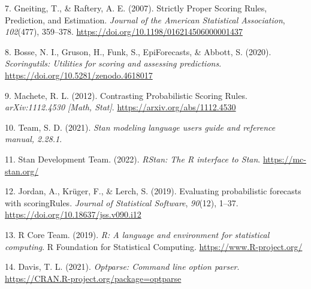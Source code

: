 \documentclass[
]{article}
\newlength{\cslhangindent}
\newlength{\cslentryspacingunit} %
\newenvironment{CSLReferences}[2] %
 {%
  \setlength{\parindent}{0pt}
  \ifodd #1
  \let\oldpar\par
  \def\par{\hangindent=\cslhangindent\oldpar}
  \fi
  \setlength{\parskip}{#2\cslentryspacingunit}
 }%
 {}
\begin{document}
\begin{CSLReferences}{1}{0}
\leavevmode{}%
7. Gneiting, T., \& Raftery, A. E. (2007). Strictly {Proper Scoring
Rules}, {Prediction}, and {Estimation}. \emph{Journal of the American
Statistical Association}, \emph{102}(477), 359--378.
\url{https://doi.org/10.1198/016214506000001437}

\leavevmode{}%
8. Bosse, N. I., Gruson, H., Funk, S., EpiForecasts, \& Abbott, S.
(2020). \emph{Scoringutils: Utilities for scoring and assessing
predictions}. \url{https://doi.org/10.5281/zenodo.4618017}

\leavevmode{}%
9. Machete, R. L. (2012). Contrasting {Probabilistic Scoring Rules}.
\emph{arXiv:1112.4530 {[}Math, Stat{]}}.
\url{https://arxiv.org/abs/1112.4530}

\leavevmode{}%
10. Team, S. D. (2021). \emph{Stan modeling language users guide and
reference manual, 2.28.1}.

\leavevmode{}%
11. Stan Development Team. (2022). \emph{{RStan}: The {R} interface to
{Stan}}. \url{https://mc-stan.org/}

\leavevmode{}%
12. Jordan, A., Krüger, F., \& Lerch, S. (2019). Evaluating
probabilistic forecasts with {scoringRules}. \emph{Journal of
Statistical Software}, \emph{90}(12), 1--37.
\url{https://doi.org/10.18637/jss.v090.i12}

\leavevmode{}%
13. R Core Team. (2019). \emph{R: A language and environment for
statistical computing}. R Foundation for Statistical Computing.
\url{https://www.R-project.org/}

\leavevmode{}%
14. Davis, T. L. (2021). \emph{Optparse: Command line option parser}.
\url{https://CRAN.R-project.org/package=optparse}

\end{CSLReferences}
\end{document}

